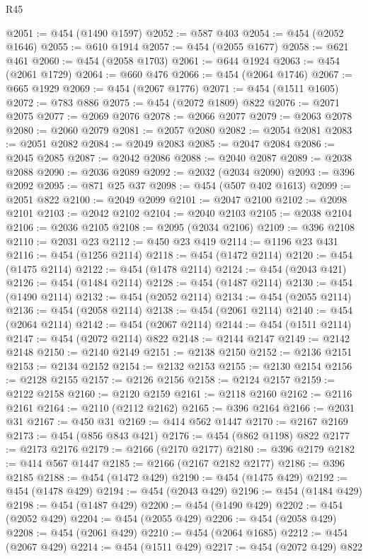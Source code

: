 \begin{lexlean}{R45}
\begin{coremodule}
{{{{{{{{{{{{{{{{{{{{{{{{{{{{{{{{{{{{{{{{{{{{{{{{{{{{{{{{{{{{{{{{{{{{{{{{{{{{{{{{{{{{{{{{{{{@2051 := @454 (@1490 @1597)
@2052 := @587 @403
@2054 := @454 (@2052 @1646)
@2055 := @610 @1914
@2057 := @454 (@2055 @1677)
@2058 := @621 @461
@2060 := @454 (@2058 @1703)
@2061 := @644 @1924
@2063 := @454 (@2061 @1729)
@2064 := @660 @476
@2066 := @454 (@2064 @1746)
@2067 := @665 @1929
@2069 := @454 (@2067 @1776)
@2071 := @454 (@1511 @1605)
@2072 := @783 @886
@2075 := @454 (@2072 @1809) @822
@2076 := @2071 @2075
@2077 := @2069 @2076
@2078 := @2066 @2077
@2079 := @2063 @2078
@2080 := @2060 @2079
@2081 := @2057 @2080
@2082 := @2054 @2081
@2083 := @2051 @2082
@2084 := @2049 @2083
@2085 := @2047 @2084
@2086 := @2045 @2085
@2087 := @2042 @2086
@2088 := @2040 @2087
@2089 := @2038 @2088
@2090 := @2036 @2089
@2092 := @2032 (@2034 @2090)
@2093 := @396 @2092
@2095 := @871 @25 @37
@2098 := @454 (@507 @402 @1613)
@2099 := @2051 @822
@2100 := @2049 @2099
@2101 := @2047 @2100
@2102 := @2098 @2101
@2103 := @2042 @2102
@2104 := @2040 @2103
@2105 := @2038 @2104
@2106 := @2036 @2105
@2108 := @2095 (@2034 @2106)
@2109 := @396 @2108
@2110 := @2031 @23
@2112 := @450 @23 @419
@2114 := @1196 @23 @431
@2116 := @454 (@1256 @2114)
@2118 := @454 (@1472 @2114)
@2120 := @454 (@1475 @2114)
@2122 := @454 (@1478 @2114)
@2124 := @454 (@2043 @421)
@2126 := @454 (@1484 @2114)
@2128 := @454 (@1487 @2114)
@2130 := @454 (@1490 @2114)
@2132 := @454 (@2052 @2114)
@2134 := @454 (@2055 @2114)
@2136 := @454 (@2058 @2114)
@2138 := @454 (@2061 @2114)
@2140 := @454 (@2064 @2114)
@2142 := @454 (@2067 @2114)
@2144 := @454 (@1511 @2114)
@2147 := @454 (@2072 @2114) @822
@2148 := @2144 @2147
@2149 := @2142 @2148
@2150 := @2140 @2149
@2151 := @2138 @2150
@2152 := @2136 @2151
@2153 := @2134 @2152
@2154 := @2132 @2153
@2155 := @2130 @2154
@2156 := @2128 @2155
@2157 := @2126 @2156
@2158 := @2124 @2157
@2159 := @2122 @2158
@2160 := @2120 @2159
@2161 := @2118 @2160
@2162 := @2116 @2161
@2164 := @2110 (@2112 @2162)
@2165 := @396 @2164
@2166 := @2031 @31
@2167 := @450 @31
@2169 := @414 @562 @1447
@2170 := @2167 @2169
@2173 := @454 (@856 @843 @421)
@2176 := @454 (@862 @1198) @822
@2177 := @2173 @2176
@2179 := @2166 (@2170 @2177)
@2180 := @396 @2179
@2182 := @414 @567 @1447
@2185 := @2166 (@2167 @2182 @2177)
@2186 := @396 @2185
@2188 := @454 (@1472 @429)
@2190 := @454 (@1475 @429)
@2192 := @454 (@1478 @429)
@2194 := @454 (@2043 @429)
@2196 := @454 (@1484 @429)
@2198 := @454 (@1487 @429)
@2200 := @454 (@1490 @429)
@2202 := @454 (@2052 @429)
@2204 := @454 (@2055 @429)
@2206 := @454 (@2058 @429)
@2208 := @454 (@2061 @429)
@2210 := @454 (@2064 @1685)
@2212 := @454 (@2067 @429)
@2214 := @454 (@1511 @429)
@2217 := @454 (@2072 @429) @822
}}}}}}}}}}}}}}}}}}}}}}}}}}}}}}}}}}}}}}}}}}}}}}}}}}}}}}}}}}}}}}}}}}}}}}}}}}}}}}}}}}}}}}}}}}}
\end{coremodule}
\end{lexlean}
